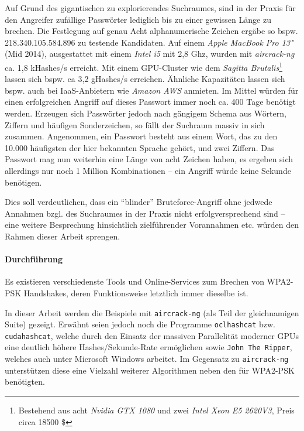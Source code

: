 Auf Grund des gigantischen zu explorierendes Suchraumes, sind in der Praxis für den Angreifer zufällige Passwörter lediglich bis zu einer gewissen Länge zu brechen. Die Festlegung auf genau Acht alphanumerische Zeichen ergäbe so bspw. 218.340.105.584.896 zu testende Kandidaten. Auf einem \textit{Apple MacBook Pro 13"} (Mid 2014), ausgestattet mit einem \textit{Intel i5} mit 2,8 Ghz, wurden mit \textit{aircrack-ng} ca. 1,8 kHashes/s erreicht. Mit einem GPU-Cluster wie dem \textit{Sagitta Brutalis}\footnote{Bestehend aus acht \textit{Nvidia GTX 1080} und zwei \textit{Intel Xeon E5 2620V3}, Preis circa 18500 \$} lassen sich bspw. ca 3,2 gHashes/s erreichen\cite{sagittabrutalisbenchmark}. Ähnliche Kapazitäten lassen sich bspw. auch bei IaaS-Anbietern wie \textit{Amazon AWS} anmieten. Im Mittel würden für einen erfolgreichen Angriff auf dieses Passwort immer noch ca. 400 Tage benötigt werden.
Erzeugen sich Passwörter jedoch nach gängigem Schema aus Wörtern, Ziffern und häufigen Sonderzeichen, so fällt der Suchraum massiv in sich zusammen. Angenommen, ein Passwort besteht aus einem Wort, das zu den 10.000 häufigsten der hier bekannten Sprache gehört, und zwei Ziffern. Das Passwort mag nun weiterhin eine Länge von acht Zeichen haben, es ergeben sich allerdings nur noch 1 Million Kombinationen -- ein Angriff würde keine Sekunde benötigen.

Dies soll verdeutlichen, dass ein \enquote{blinder} Bruteforce-Angriff ohne jedwede Annahmen bzgl. des Suchraumes in der Praxis nicht erfolgversprechend sind -- eine weitere Besprechung hinsichtlich zielführender Vorannahmen etc. würden den Rahmen dieser Arbeit sprengen.

\paragraph{Durchführung}
Es existieren verschiedenste Tools und Online-Services zum Brechen von WPA2-PSK Handshakes, deren Funktionsweise letztlich immer dieselbe ist.

In dieser Arbeit werden die Beispiele mit \texttt{aircrack-ng} (als Teil der gleichnamigen Suite) gezeigt. Erwähnt seien jedoch noch die Programme \texttt{oclhashcat} bzw. \texttt{cudahashcat}, welche durch den Einsatz der massiven Parallelität moderner GPUs eine deutlich höhere Hashes/Sekunde-Rate ermöglichen sowie \texttt{John The Ripper}, welches auch unter Microsoft Windows arbeitet. Im Gegensatz zu \texttt{aircrack-ng} unterstützen diese eine Vielzahl weiterer Algorithmen neben den für WPA2-PSK benötigten.\\


